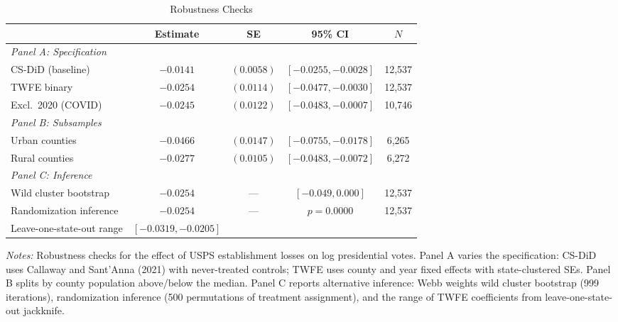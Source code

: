 \begin{table}[htbp]
\centering
\caption{Robustness Checks}
\label{tab:robust}
\begin{tabular}{lcccc}
\hline\hline
 & Estimate & SE & 95\% CI & $N$ \\
\hline
\textit{Panel A: Specification} & & & & \\
CS-DiD (baseline) & $-0.0141$ & $(0.0058)$ & $[-0.0255, -0.0028]$ & 12,537 \\
TWFE binary & $-0.0254$ & $(0.0114)$ & $[-0.0477, -0.0030]$ & 12,537 \\
Excl.\ 2020 (COVID) & $-0.0245$ & $(0.0122)$ & $[-0.0483, -0.0007]$ & 10,746 \\
[3pt]
\textit{Panel B: Subsamples} & & & & \\
Urban counties & $-0.0466$ & $(0.0147)$ & $[-0.0755, -0.0178]$ & 6,265 \\
Rural counties & $-0.0277$ & $(0.0105)$ & $[-0.0483, -0.0072]$ & 6,272 \\
[3pt]
\textit{Panel C: Inference} & & & & \\
Wild cluster bootstrap & $-0.0254$ & --- & $[-0.049, 0.000]$ & 12,537 \\
Randomization inference & $-0.0254$ & --- & $p = 0.0000$ & 12,537 \\
Leave-one-state-out range & $[-0.0319, -0.0205]$ & & & \\
\hline\hline
\end{tabular}
\begin{tablenotes}
\small
\item \textit{Notes:} Robustness checks for the effect of USPS establishment losses on log presidential votes. Panel A varies the specification: CS-DiD uses Callaway and Sant'Anna (2021) with never-treated controls; TWFE uses county and year fixed effects with state-clustered SEs. Panel B splits by county population above/below the median. Panel C reports alternative inference: Webb weights wild cluster bootstrap (999 iterations), randomization inference (500 permutations of treatment assignment), and the range of TWFE coefficients from leave-one-state-out jackknife.
\end{tablenotes}
\end{table}
